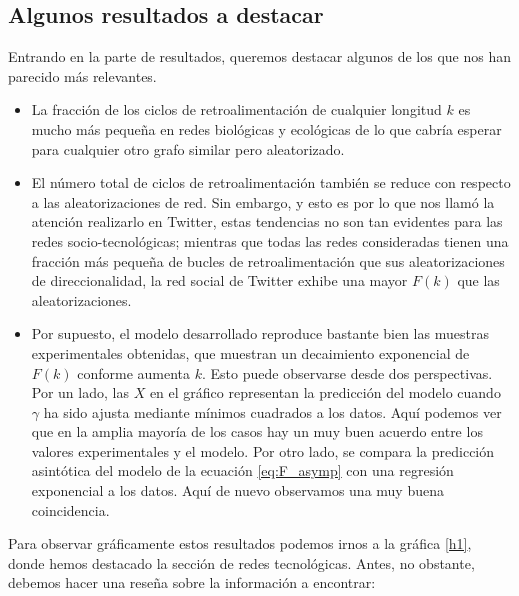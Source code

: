 \documentclass[1p]{elsarticle}
\begin{document}
\subsection{Algunos resultados a destacar}
Entrando en la parte de resultados, queremos destacar algunos de los que nos han parecido más relevantes.
\begin{itemize}
	\item La fracción de los ciclos de retroalimentación de cualquier longitud $k$ es mucho más pequeña en redes biológicas y ecológicas de lo que cabría esperar para cualquier otro grafo similar pero aleatorizado.
	\item El número total de ciclos de retroalimentación también se reduce 
	con respecto a las aleatorizaciones de red. Sin embargo, y esto es por lo que nos llamó la atención realizarlo en Twitter, estas tendencias no son tan evidentes para las redes socio-tecnológicas; mientras que todas las redes consideradas tienen una fracción más pequeña de bucles de retroalimentación que sus aleatorizaciones de direccionalidad, la red social de Twitter exhibe una mayor $F(k)$ que las aleatorizaciones.
	\item Por supuesto, el modelo desarrollado reproduce bastante bien las muestras experimentales obtenidas, que muestran un decaimiento exponencial de $F(k)$ conforme aumenta $k$.
        Esto puede observarse desde dos perspectivas.
        Por un lado, las $X$ en el gráfico representan la predicción del modelo cuando $\gamma$ ha sido ajusta mediante mínimos cuadrados a los datos.
        Aquí podemos ver que en la amplia mayoría de los casos hay un muy buen acuerdo entre los valores experimentales y el modelo.
        Por otro lado, se compara la predicción asintótica del modelo de la ecuación \ref{eq:F_asymp} con una regresión exponencial a los datos.
        Aquí de nuevo observamos una muy buena coincidencia.
        
\end{itemize}

Para observar gráficamente estos resultados podemos irnos a la gráfica \ref{h1}, donde hemos destacado la sección de redes tecnológicas. Antes, no obstante, debemos hacer una reseña sobre la información a encontrar:
\end{document}
